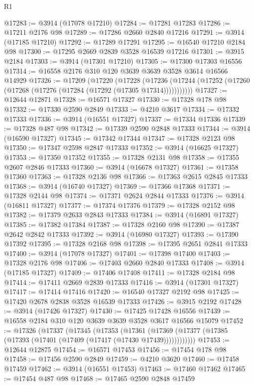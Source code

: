 \begin{lexlean}{R1}
\begin{coremodule}
@17283 := @3914 (@17078 @17210)
@17284 := @17281 @17283
@17286 := @17211 @2176 @98
@17289 := @17286 @2660 @2840 @17216
@17291 := @3914 (@17185 @17210)
@17292 := @17289 @17291
@17295 := @16540 @17210 @2184 @98
@17300 := @17295 @2669 @2839 @3528 @16539 @17216
@17301 := @3915 @2184
@17303 := @3914 (@17301 @17210)
@17305 := @17300 @17303 @16556
@17314 := @16558 @2176 @310 @120 @3639 @3639 @3528 @3614 @16566 @14929
@17326 := @17209
    (@17220
      (@17228
        (@17236 (@17244 (@17252 (@17260 (@17268 (@17276 (@17284 (@17292 (@17305 @17314)))))))))))
@17327 := @12644 @12871
@17328 := @16571 @17327
@17330 := @17328 @178 @98
@17332 := @17330 @2590 @2849
@17333 := @4210 @3617
@17334 := @17332 @17333
@17336 := @3914 (@16551 @17327)
@17337 := @17334 @17336
@17339 := @17328 @487 @98
@17342 := @17339 @2590 @2848 @17333
@17344 := @3914 (@16590 @17327)
@17345 := @17342 @17344
@17347 := @17328 @2123 @98
@17350 := @17347 @2598 @2847 @17333
@17352 := @3914 (@16625 @17327)
@17353 := @17350 @17352
@17355 := @17328 @2131 @98
@17358 := @17355 @2607 @2846 @17333
@17360 := @3914 (@16678 @17327)
@17361 := @17358 @17360
@17363 := @17328 @2136 @98
@17366 := @17363 @2615 @2845 @17333
@17368 := @3914 (@16740 @17327)
@17369 := @17366 @17368
@17371 := @17328 @2144 @98
@17374 := @17371 @2624 @2844 @17333
@17376 := @3914 (@16811 @17327)
@17377 := @17374 @17376
@17379 := @17328 @2152 @98
@17382 := @17379 @2633 @2843 @17333
@17384 := @3914 (@16891 @17327)
@17385 := @17382 @17384
@17387 := @17328 @2160 @98
@17390 := @17387 @2642 @2842 @17333
@17392 := @3914 (@16980 @17327)
@17393 := @17390 @17392
@17395 := @17328 @2168 @98
@17398 := @17395 @2651 @2841 @17333
@17400 := @3914 (@17078 @17327)
@17401 := @17398 @17400
@17403 := @17328 @2176 @98
@17406 := @17403 @2660 @2840 @17333
@17408 := @3914 (@17185 @17327)
@17409 := @17406 @17408
@17411 := @17328 @2184 @98
@17414 := @17411 @2669 @2839 @17333
@17416 := @3914 (@17301 @17327)
@17417 := @17414 @17416
@17420 := @16540 @17327 @2192 @98
@17425 := @17420 @2678 @2838 @3528 @16539 @17333
@17426 := @3915 @2192
@17428 := @3914 (@17426 @17327)
@17430 := @17425 @17428 @16556
@17439 := @16558 @2184 @310 @120 @3639 @3639 @3528 @3617 @16566 @15079
@17452 := @17326
    (@17337
      (@17345
        (@17353
          (@17361 (@17369 (@17377 (@17385 (@17393 (@17401 (@17409 (@17417 (@17430 @17439))))))))))))
@17453 := @12644 @12875
@17454 := @16571 @17453
@17456 := @17454 @178 @98
@17458 := @17456 @2590 @2849
@17459 := @4210 @3620
@17460 := @17458 @17459
@17462 := @3914 (@16551 @17453)
@17463 := @17460 @17462
@17465 := @17454 @487 @98
@17468 := @17465 @2590 @2848 @17459

\end{coremodule}
\end{lexlean}
